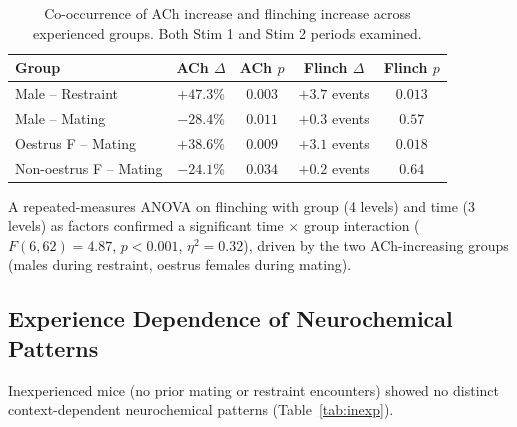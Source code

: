 \documentclass[11pt]{article}
\begin{document}
\begin{table}[H]
\centering
\caption{Co-occurrence of ACh increase and flinching increase across experienced groups. Both Stim 1 and Stim 2 periods examined.}
\label{tab:ach_flinch}
\begin{tabular}{lcccc}
\toprule
Group & ACh $\Delta$ & ACh $p$ & Flinch $\Delta$ & Flinch $p$ \\
\midrule
Male -- Restraint & $+47.3\%$ & $0.003$ & $+3.7$ events & $0.013$ \\
Male -- Mating & $-28.4\%$ & $0.011$ & $+0.3$ events & $0.57$ \\
Oestrus F -- Mating & $+38.6\%$ & $0.009$ & $+3.1$ events & $0.018$ \\
Non-oestrus F -- Mating & $-24.1\%$ & $0.034$ & $+0.2$ events & $0.64$ \\
\bottomrule
\end{tabular}
\end{table}

A repeated-measures ANOVA on flinching with group (4 levels) and time (3 levels) as factors confirmed a significant time $\times$ group interaction ($F(6,62) = 4.87$, $p < 0.001$, $\eta^2 = 0.32$), driven by the two ACh-increasing groups (males during restraint, oestrus females during mating).

\subsection{Experience Dependence of Neurochemical Patterns}

Inexperienced mice (no prior mating or restraint encounters) showed no distinct context-dependent neurochemical patterns (Table~\ref{tab:inexp}).
\end{document}
